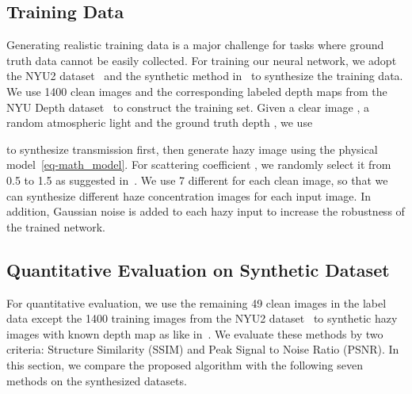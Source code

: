 \documentclass[10pt,twocolumn,letterpaper]{article}
\begin{document}
\subsection{Training Data}
Generating realistic training data is a major challenge
for tasks where ground truth data cannot be easily collected.
For training our neural network, we adopt the NYU2 dataset~\cite{silberman2012indoor}
and the synthetic method in~\cite{ren2016single} to synthesize the training data.
We use 1400 clean images and the corresponding labeled depth maps from the NYU Depth dataset~\cite{silberman2012indoor} to construct the training set.
Given a clear image , a random atmospheric light  and the ground truth depth , we use

to synthesize transmission first, then generate
hazy image using the physical model~\eqref{eq-math_model}.
For scattering coefficient ,
we randomly select it from
0.5 to 1.5 as suggested in~\cite{ren2016single}.
We use 7 different  for each clean image, so that we can
synthesize different haze concentration images for each input image.
In addition,  Gaussian noise is added to each hazy input to increase the robustness of the trained network.


\subsection{Quantitative Evaluation on Synthetic Dataset}
For quantitative evaluation, we use the remaining 49 clean images in the label data except the 1400 training images from the NYU2 dataset~\cite{silberman2012indoor} to synthetic hazy images with known depth map  as like in~\cite{ren2016single}.
We evaluate these methods by two criteria: Structure Similarity (SSIM) and Peak Signal to Noise Ratio (PSNR).
In this section, we compare the proposed algorithm with the following seven
methods on the synthesized datasets.
\end{document}
